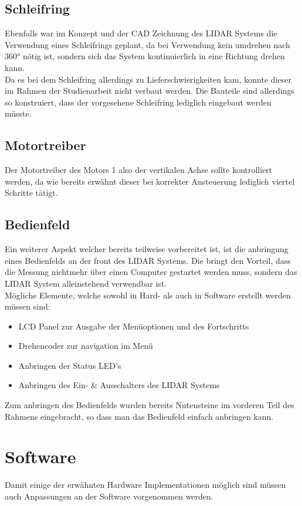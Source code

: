 \subsection{Schleifring}
Ebenfalls war im Konzept und der \ac{CAD} Zeichnung des \ac{LIDAR} Systems die Verwendung eines Schleifrings geplant, da bei Verwendung kein umdrehen nach 360° nötig ist, sondern sich das System kontinuierlich in eine Richtung drehen kann.\\
Da es bei dem Schleifring allerdings zu Lieferschwierigkeiten kam, konnte dieser im Rahmen der Studienarbeit nicht verbaut werden. Die Bauteile sind allerdings so konstruiert, dass der vorgesehene Schleifring lediglich eingebaut werden müsste. 
\subsection{Motortreiber}
Der Motortreiber des Motors 1 also der vertikalen Achse sollte kontrolliert werden, da wie bereits erwähnt dieser bei korrekter Ansteuerung lediglich viertel Schritte tätigt. 
\subsection{Bedienfeld}
Ein weiterer Aspekt welcher bereits teilweise vorbereitet ist, ist die anbringung eines Bedienfelds an der front des \ac{LIDAR} Systems. Die bringt den Vorteil, dass die Messung nichtmehr über einen Computer gestartet werden muss, sondern das \ac{LIDAR} System alleinstehend verwendbar ist.\\
Mögliche Elemente, welche sowohl in Hard- als auch in Software erstellt werden müssen sind:
\begin{itemize}
	\item LCD Panel zur Ausgabe der Menüoptionen und des Fortschritts
	\item Drehencoder zur navigation im Menü
	\item Anbringen der Status LED's
	\item Anbringen des Ein- \& Ausschalters des \ac{LIDAR} Systems
\end{itemize}
Zum anbringen des Bedienfelds wurden bereits Nutensteine im vorderen Teil des Rahmens eingebracht, so dass man das Bedienfeld einfach anbringen kann.

\section{Software}
Damit einige der erwähnten Hardware Implementationen möglich sind müssen auch Anpassungen an der Software vorgenommen werden.
